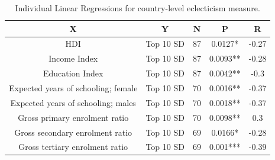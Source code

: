 \documentclass[a4paper]{article}
\begin{document}
\begin{table}[h!]
\centering
\begin{tabular}{|c|c|c|c|c|}
\hline
X & Y & N & P & R \\
\hline
\Gls{HDI} & Top 10 SD & 87 & 0.0127* & -0.27 \\
\hline
Income Index & Top 10 SD & 87 & 0.0093** & -0.28 \\
\hline
Education Index & Top 10 SD & 87 & 0.0042** & -0.3 \\
\hline
Expected years of schooling; female & Top 10 SD & 70 & 0.0016** & -0.37 \\
\hline
Expected years of schooling; males & Top 10 SD & 70 & 0.0018** & -0.37 \\
\hline
Gross primary enrolment ratio & Top 10 SD & 70 & 0.0098** & 0.3 \\
\hline
Gross secondary enrolment ratio & Top 10 SD & 69 & 0.0166* & -0.28 \\
\hline
Gross tertiary enrolment ratio & Top 10 SD & 69 & 0.001*** & -0.39 \\
\hline
\end{tabular}
\caption[Country-level Linear Regressions]{Individual Linear Regressions for country-level eclecticism measure.}
\label{tab:hdi_lin_country}
\end{table}
\end{document}
